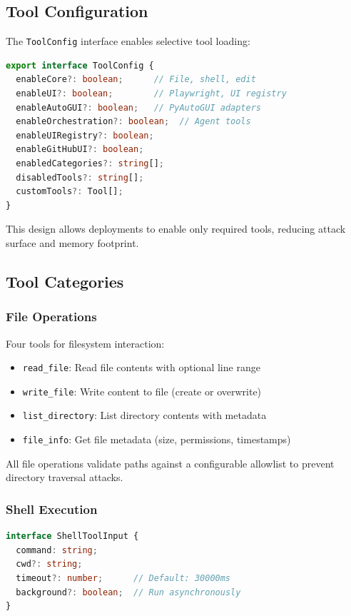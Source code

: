 \subsection{Tool Configuration}

The \texttt{ToolConfig} interface enables selective tool loading:

\begin{lstlisting}[language=TypeScript]
export interface ToolConfig {
  enableCore?: boolean;      // File, shell, edit
  enableUI?: boolean;        // Playwright, UI registry
  enableAutoGUI?: boolean;   // PyAutoGUI adapters
  enableOrchestration?: boolean;  // Agent tools
  enableUIRegistry?: boolean;
  enableGitHubUI?: boolean;
  enabledCategories?: string[];
  disabledTools?: string[];
  customTools?: Tool[];
}
\end{lstlisting}

This design allows deployments to enable only required tools, reducing attack surface and memory footprint.

\subsection{Tool Categories}

\subsubsection{File Operations}

Four tools for filesystem interaction:
\begin{itemize}
    \item \texttt{read\_file}: Read file contents with optional line range
    \item \texttt{write\_file}: Write content to file (create or overwrite)
    \item \texttt{list\_directory}: List directory contents with metadata
    \item \texttt{file\_info}: Get file metadata (size, permissions, timestamps)
\end{itemize}

All file operations validate paths against a configurable allowlist to prevent directory traversal attacks.

\subsubsection{Shell Execution}

\begin{lstlisting}[language=TypeScript]
interface ShellToolInput {
  command: string;
  cwd?: string;
  timeout?: number;      // Default: 30000ms
  background?: boolean;  // Run asynchronously
}
\end{lstlisting}

